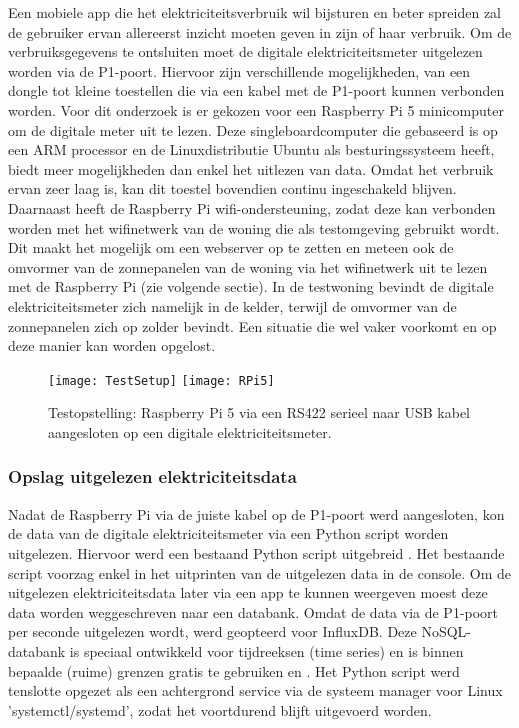 Een mobiele app die het elektriciteitsverbruik wil bijsturen en beter spreiden zal de gebruiker ervan allereerst inzicht moeten geven in zijn of haar verbruik. Om de verbruiksgegevens te ontsluiten moet de digitale elektriciteitsmeter uitgelezen worden via de P1-poort. Hiervoor zijn verschillende mogelijkheden, van een dongle tot kleine toestellen die via een kabel met de P1-poort kunnen verbonden worden. Voor dit onderzoek is er gekozen voor een Raspberry Pi 5 minicomputer om de digitale meter uit te lezen. Deze singleboardcomputer die gebaseerd is op een ARM processor en de Linuxdistributie Ubuntu als besturingssysteem heeft, biedt meer mogelijkheden dan enkel het uitlezen van data. Omdat het verbruik ervan zeer laag is, kan dit toestel bovendien continu ingeschakeld blijven. Daarnaast heeft de Raspberry Pi wifi-ondersteuning, zodat deze kan verbonden worden met het wifinetwerk van de woning die als testomgeving gebruikt wordt. Dit maakt het mogelijk om een webserver op te zetten en meteen ook de omvormer van de zonnepanelen van de woning via het wifinetwerk uit te lezen met de Raspberry Pi (zie volgende sectie). In de testwoning bevindt de digitale elektriciteitsmeter zich namelijk in de kelder, terwijl de omvormer van de zonnepanelen zich op zolder bevindt. Een situatie die wel vaker voorkomt en op deze manier kan worden opgelost.

\begin{figure}[h!]
    \centering
    \texttt{[image: TestSetup]} \hspace{0.7cm}
    \texttt{[image: RPi5]}
    \caption{Testopstelling: Raspberry Pi 5 via een RS422 serieel naar USB kabel aangesloten op een digitale elektriciteitsmeter.}
\end{figure}

\subsubsection{Opslag uitgelezen elektriciteitsdata}

Nadat de Raspberry Pi via de juiste kabel op de P1-poort werd aangesloten, kon de data van de digitale elektriciteitsmeter via een Python script worden uitgelezen. Hiervoor werd een bestaand Python script uitgebreid \autocite{Depuydt2021}. Het bestaande script voorzag enkel in het uitprinten van de uitgelezen data in de console. Om de uitgelezen elektriciteitsdata later via een app te kunnen weergeven moest deze data worden weggeschreven naar een databank. Omdat de data via de P1-poort per seconde uitgelezen wordt, werd geopteerd voor InfluxDB. Deze NoSQL-databank is speciaal ontwikkeld voor tijdreeksen (time series) en is binnen bepaalde (ruime) grenzen gratis te gebruiken \autocite{Balis2017} en  \autocite{Struckov2019}. Het Python script werd tenslotte opgezet als een achtergrond service via de systeem manager voor Linux 'systemctl/systemd', zodat het voortdurend blijft uitgevoerd worden.

